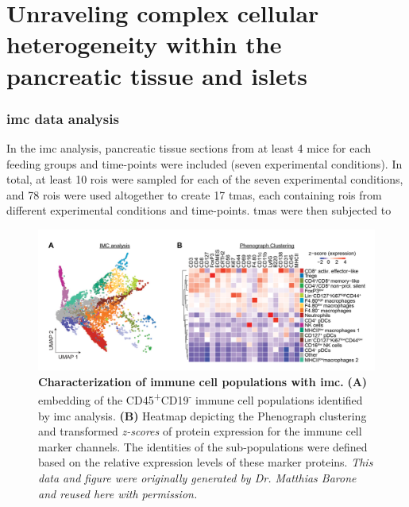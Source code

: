 \section[Unraveling complex cellular heterogeneity within the pancreatic tissue and islets]{Unraveling complex cellular heterogeneity within the\\pancreatic tissue and islets}
\label{sec:chp2_imc_scrna}

\subsubsection{\large \gls{imc} data analysis}
\label{sec_chp2_imc1}

In the \gls{imc} analysis, pancreatic tissue sections from at least 4 mice for each feeding groups and time-points were included (seven experimental conditions). In total, at least 10 \glspl{roi} were sampled for each of the seven experimental conditions, and 78 \glspl{roi} were used altogether to create 17 \glspl{tma}, each containing \glspl{roi} from different experimental conditions and time-points. \glspl{tma} were then subjected to 

\begin{figure}[H]
\centering
\includegraphics[width=\linewidth]{Chapter4/Fig/F2-2-01.png}
\caption[Characterization of immune cell populations with ]{\textbf{Characterization of immune cell populations with \gls{imc}.} \textbf{(A)}  embedding of the CD45\textsuperscript{+}CD19\textsuperscript{-} immune cell populations identified by \gls{imc} analysis. \textbf{(B)}  Heatmap depicting the Phenograph clustering and transformed \textit{z-scores} of protein expression for the immune cell marker channels. The identities of the sub-populations were defined based on the relative expression levels of these marker proteins. \textit{This data and figure were originally generated by Dr. Matthias Barone and reused here with permission.}}
\label{fig:chp2_imc_umap}
\end{figure}


